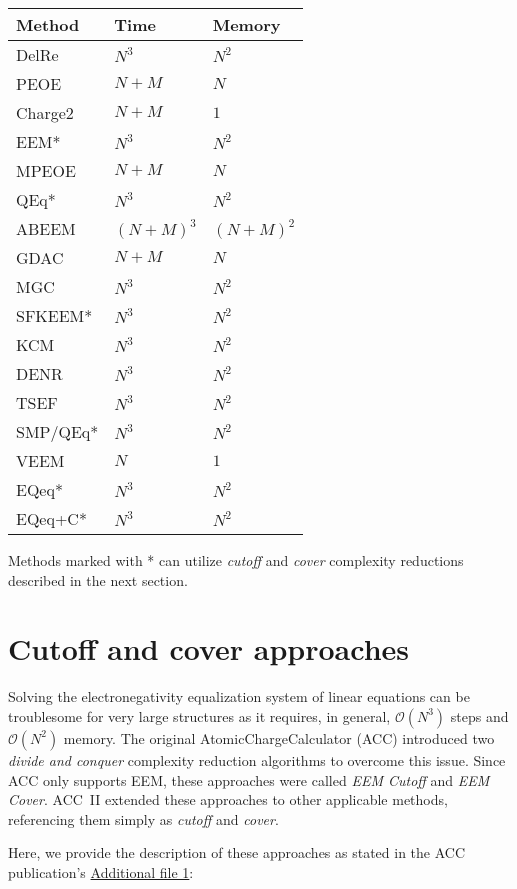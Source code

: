 \documentclass[oneside]{memoir}
\begin{document}
\begin{center}
\begin{tabular}{lll}
\toprule
Method & Time & Memory\\
\midrule
DelRe & $N^3$ & $N^2$\\
PEOE  & $N + M$ & $N$\\
Charge2 & $N + M$ & $1$\\
EEM* & $N^3$ & $N^2$\\
MPEOE & $N + M$& $N$\\
QEq* & $N^3$ & $N^2$ \\
ABEEM & $(N + M)^3$ & $(N + M)^2$\\
GDAC & $N + M$ & $N$\\
MGC & $N^3$& $N^2$\\
SFKEEM* & $N^3$& $N^2$\\
KCM & $N^3$ & $N^2$\\
DENR & $N^3$& $N^2$\\
TSEF & $N^3$ & $N^2$ \\
SMP/QEq* & $N^3$& $N^2$\\
VEEM & $N$& $1$ \\
EQeq* & $N^3$ & $N^2$ \\
EQeq+C* & $N^3$ & $N^2$\\
\bottomrule
\end{tabular}
\end{center}

\bigskip

Methods marked with * can utilize \textit{cutoff} and \textit{cover} complexity reductions described in the next section.

\chapter*{Cutoff and cover approaches}

Solving the electronegativity equalization system of linear equations can be troublesome for very large structures as it requires, in general, ${\mathcal O}(N^3)$ steps and ${\mathcal O}(N^2)$ memory. The original AtomicChargeCalculator (ACC) introduced two \textit{divide and conquer} complexity reduction algorithms to overcome this issue. Since ACC only supports EEM, these approaches were called \textit{EEM Cutoff} and \textit{EEM Cover}. ACC~II extended these approaches to other applicable methods, referencing them simply as \textit{cutoff} and \textit{cover}.

Here, we provide the description of these approaches as stated in the ACC publication's \cite{Ionescu2015} \href{https://static-content.springer.com/esm/art%3A10.1186%2Fs13321-015-0099-x/MediaObjects/13321_2015_99_MOESM1_ESM.pdf}{Additional file 1}:
\end{document}
